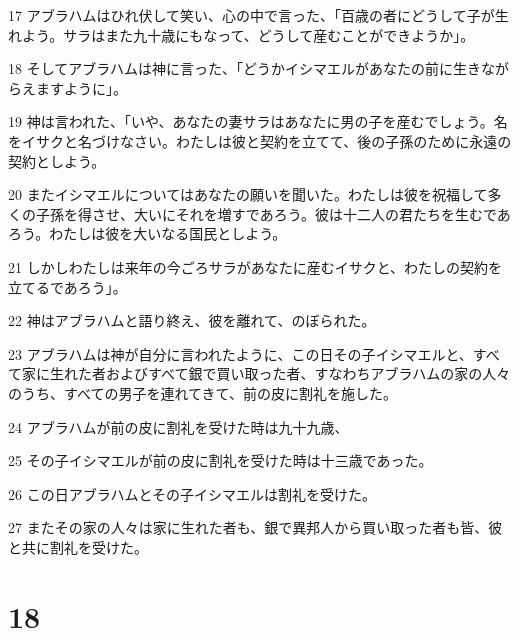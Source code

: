 \par 17 アブラハムはひれ伏して笑い、心の中で言った、「百歳の者にどうして子が生れよう。サラはまた九十歳にもなって、どうして産むことができようか」。
\par 18 そしてアブラハムは神に言った、「どうかイシマエルがあなたの前に生きながらえますように」。
\par 19 神は言われた、「いや、あなたの妻サラはあなたに男の子を産むでしょう。名をイサクと名づけなさい。わたしは彼と契約を立てて、後の子孫のために永遠の契約としよう。
\par 20 またイシマエルについてはあなたの願いを聞いた。わたしは彼を祝福して多くの子孫を得させ、大いにそれを増すであろう。彼は十二人の君たちを生むであろう。わたしは彼を大いなる国民としよう。
\par 21 しかしわたしは来年の今ごろサラがあなたに産むイサクと、わたしの契約を立てるであろう」。
\par 22 神はアブラハムと語り終え、彼を離れて、のぼられた。
\par 23 アブラハムは神が自分に言われたように、この日その子イシマエルと、すべて家に生れた者およびすべて銀で買い取った者、すなわちアブラハムの家の人々のうち、すべての男子を連れてきて、前の皮に割礼を施した。
\par 24 アブラハムが前の皮に割礼を受けた時は九十九歳、
\par 25 その子イシマエルが前の皮に割礼を受けた時は十三歳であった。
\par 26 この日アブラハムとその子イシマエルは割礼を受けた。
\par 27 またその家の人々は家に生れた者も、銀で異邦人から買い取った者も皆、彼と共に割礼を受けた。

\chapter{18}

